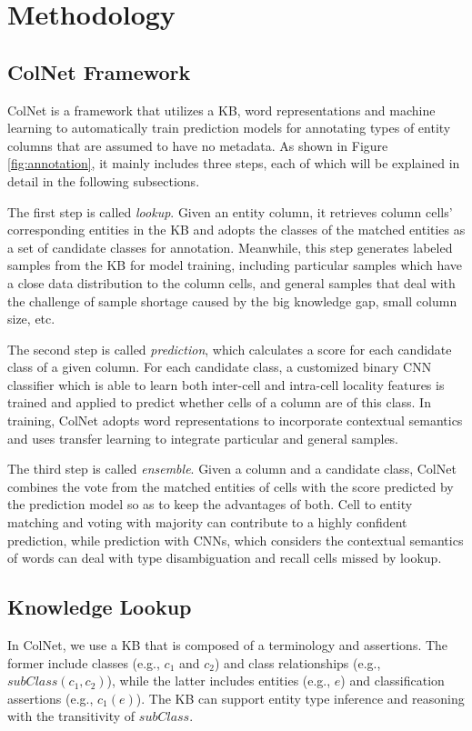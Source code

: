 \documentclass[letterpaper]{article}
\newcommand{\ernesto}[1]{{\color{black}#1}}
\newcommand{\rv}[1]{{\color{black}#1}}
\newcommand{\camera}[1]{{\color{black}#1}}
\newcommand{\ColNet}{\textsf{ColNet}\xspace}
\begin{document}
\section{Methodology}

\subsection{\ColNet Framework}

\ColNet is
a framework that utilizes a KB, word representations and machine learning to automatically train prediction models for annotating types of entity columns that are assumed to have no metadata.
As shown in Figure \ref{fig:annotation}, it mainly includes three steps, 
\rv{each of which will be explained in detail in the following subsections.}

The first step is called \textit{lookup}.
Given an entity column,
it retrieves column cells' corresponding entities in the KB and adopts the classes of the matched entities as a set of candidate classes for annotation.
Meanwhile, this step generates labeled samples from the KB for model training,
including particular samples which have a close data distribution to the column cells,
and general samples that 
deal with the challenge of \rv{sample shortage}
caused by the big knowledge gap, small column size, etc.


The second step is called \textit{prediction}, 
which calculates a score for each candidate class \rv{of} a given column.
For each candidate class, a customized binary CNN classifier
which is able to learn both inter-cell and intra-cell locality features
is trained and applied to predict whether cells of a column are of this class.
In training, \ColNet adopts \rv{word representations to incorporate contextual semantics and uses transfer learning to integrate particular and general samples.}



The third step is called \textit{ensemble}.
Given a column and a candidate class,
\ColNet combines the vote from the matched entities of cells with the score predicted by the prediction model 
so as to keep the advantages of both.
Cell to entity matching and voting with majority can contribute to a highly confident prediction,
while prediction with CNNs, which \camera{considers} the contextual \rv{semantics} of words
can deal with \rv{type disambiguation and recall cells missed by lookup}.


\subsection{Knowledge Lookup}
\rv{In \ColNet, we use a KB that is composed of 
\ernesto{a terminology}
and assertions.
The former include classes (e.g., $c_1$ and $c_2$) and class relationships (e.g., $subClass(c_1,c_2)$),
while the latter includes entities (e.g., $e$) and classification assertions (e.g., $c_1(e)$).
The KB can support entity type inference and reasoning with the transitivity of $subClass$.
}
\end{document}
